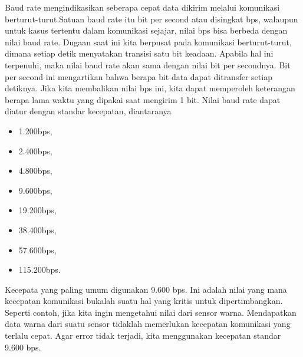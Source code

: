 Baud rate mengindikasikan seberapa cepat data dikirim melalui komunikasi berturut-turut.Satuan baud rate itu bit per second atau disingkat bps, walaupun untuk kasus tertentu dalam komunikasi sejajar, nilai bps bisa berbeda dengan nilai baud rate. Dugaan saat ini kita berpusat pada komunikasi berturut-turut, dimana setiap detik menyatakan transisi satu bit keadaan. Apabila hal ini terpenuhi, maka nilai baud rate akan sama dengan nilai bit per secondnya. Bit per second ini mengartikan bahwa berapa bit data dapat ditransfer setiap detiknya. Jika kita membalikan nilai bps ini, kita dapat memperoleh keterangan berapa lama waktu yang dipakai saat mengirim 1 bit. Nilai baud rate dapat diatur dengan standar kecepatan, diantaranya 
\begin {itemize}
	\item 1.200bps,
	\item 2.400bps, 
	\item 4.800bps, 
	\item 9.600bps, 
	\item 19.200bps, 
	\item 38.400bps, 
	\item 57.600bps,
	\item 115.200bps. 
\end {itemize}	
	Kecepata yang paling umum digunakan 9.600 bps. Ini adalah nilai yang mana kecepatan komunikasi bukalah suatu hal yang kritis untuk dipertimbangkan. Seperti contoh, jika kita ingin mengetahui nilai dari sensor warna. Mendapatkan data warna dari suatu sensor tidaklah memerlukan kecepatan komunikasi yang terlalu cepat. Agar  error tidak terjadi, kita menggunakan kecepatan standar 9.600 bps.

